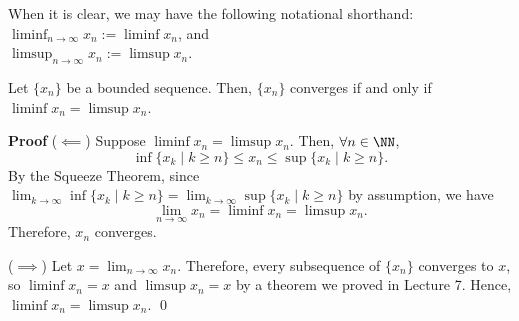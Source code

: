 \begin{notation}
When it is clear, we may have the following notational shorthand: $\liminf_{n\to \infty} x_n := \liminf x_n$, and \\$\limsup_{n\to \infty} x_n := \limsup x_n$.
\end{notation}

\begin{theorem}
Let $\{x_n\}$ be a bounded sequence. Then, $\{x_n\}$ converges if and only if $\liminf x_n = \limsup x_n.$
\end{theorem}
\textbf{Proof} ($\impliedby$) Suppose $\liminf x_n = \limsup x_n$. Then, $\forall n\in \NN$,
\[
\inf\{x_k \mid k \geq n\} \leq x_n \leq \sup \{x_k\mid k\geq n\}.
\]
By the Squeeze Theorem, since $\lim_{k\to \infty} \inf \{x_k \mid k\geq n\} = \lim_{k\to \infty} \sup \{x_k \mid k\geq n\}$ by assumption, we have 
\[
\lim_{n\to \infty} x_n = \liminf x_n = \limsup x_n.
\]
Therefore, $x_n$ converges. 

($\implies$) Let $x = \lim_{n\to \infty} x_n$. Therefore, every subsequence of $\{x_n\}$ converges to $x$, so $\liminf x_n = x$ and $\limsup x_n =x$ by a theorem we proved in Lecture 7. Hence, $\liminf x_n = \limsup x_n.$ \qed 
